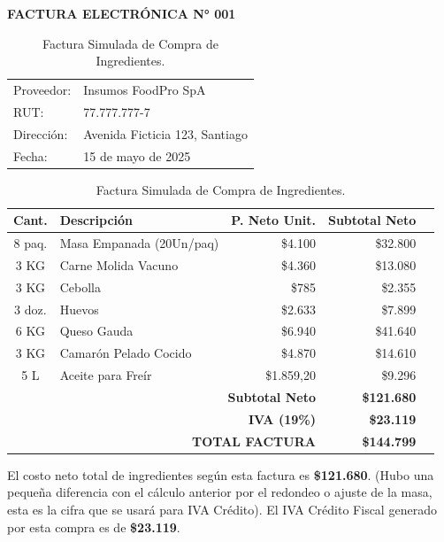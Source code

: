 \documentclass[12pt]{article}
\begin{document}
\begin{table}[h!]
    \centering
    \textbf{FACTURA ELECTRÓNICA N° 001} \\
    \vspace{0.2cm}
    \begin{tabular}{l l}
        Proveedor: & Insumos FoodPro SpA \\
        RUT: & 77.777.777-7 \\
        Dirección: & Avenida Ficticia 123, Santiago \\
        Fecha: & 15 de mayo de 2025 \\
    \end{tabular}
    \vspace{0.3cm}
    \begin{tabular}{|c|l|r|r|r|}
        \hline
        \textbf{Cant.} & \textbf{Descripción} & \textbf{P. Neto Unit.} & \textbf{Subtotal Neto} \\
        \hline
        8 paq. & Masa Empanada (20Un/paq) & \$4.100 & \$32.800 \\
        3 KG & Carne Molida Vacuno & \$4.360 & \$13.080 \\
        3 KG & Cebolla & \$785 & \$2.355 \\
        3 doz. & Huevos & \$2.633 & \$7.899 \\
        6 KG & Queso Gauda & \$6.940 & \$41.640 \\
        3 KG & Camarón Pelado Cocido & \$4.870 & \$14.610 \\
        5 L & Aceite para Freír & \$1.859,20 & \$9.296 \\
        \hline
        \multicolumn{3}{|r|}{\textbf{Subtotal Neto}} & \textbf{\$121.680} \\ %
        \multicolumn{3}{|r|}{\textbf{IVA (19\%)}} & \textbf{\$23.119} \\
        \multicolumn{3}{|r|}{\textbf{TOTAL FACTURA}} & \textbf{\$144.799} \\
        \hline
    \end{tabular}
    \caption{Factura Simulada de Compra de Ingredientes.}
    \label{tab:factura_compra}
\end{table}
El costo neto total de ingredientes según esta factura es \textbf{\$121.680}. (Hubo una pequeña diferencia con el cálculo anterior por el redondeo o ajuste de la masa, esta es la cifra que se usará para IVA Crédito).
El IVA Crédito Fiscal generado por esta compra es de \textbf{\$23.119}.
\end{document}
